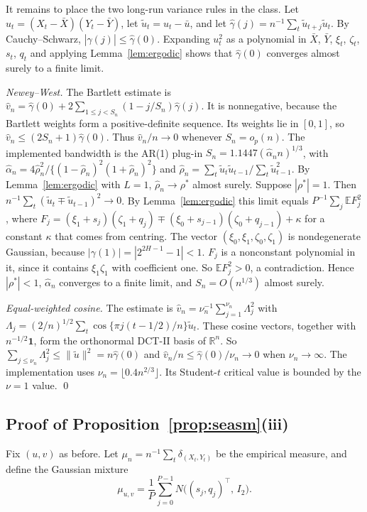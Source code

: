 \documentclass[11pt]{article}
\theoremstyle{remark}
\newcommand{\E}{\mathbb E}
\newcommand{\one}{\mathbf 1}
\begin{document}
It remains to place the two long-run variance rules in the class. Let $u_t=(X_t-\bar X)(Y_t-\bar Y)$, let $\tilde u_t=u_t-\bar u$, and let $\hat\gamma(j)=n^{-1}\sum_{t}\tilde u_{t+j}\tilde u_t$. By Cauchy--Schwarz, $|\hat\gamma(j)|\le\hat\gamma(0)$. Expanding $u_t^2$ as a polynomial in $\bar X$, $\bar Y$, $\xi_t$, $\zeta_t$, $s_t$, $q_t$ and applying Lemma~\ref{lem:ergodic} shows that $\hat\gamma(0)$ converges almost surely to a finite limit.

\emph{Newey--West.} The Bartlett estimate is $\hat v_n=\hat\gamma(0)+2\sum_{1\le j<S_n}(1-j/S_n)\hat\gamma(j)$. It is nonnegative, because the Bartlett weights form a positive-definite sequence. Its weights lie in $[0,1]$, so $\hat v_n\le(2S_n+1)\hat\gamma(0)$. Thus $\hat v_n/n\to0$ whenever $S_n=o_p(n)$. The implemented bandwidth is the \citet{andrews1991hac} AR(1) plug-in $S_n=1.1447(\hat\alpha_n n)^{1/3}$, with $\hat\alpha_n=4\hat\rho_n^2/\{(1-\hat\rho_n)^2(1+\hat\rho_n)^2\}$ and $\hat\rho_n=\sum_t\tilde u_t\tilde u_{t-1}/\sum_t\tilde u_{t-1}^2$. By Lemma~\ref{lem:ergodic} with $L=1$, $\hat\rho_n\to\rho^*$ almost surely. Suppose $|\rho^*|=1$. Then $n^{-1}\sum_t(\tilde u_t\mp\tilde u_{t-1})^2\to0$. By Lemma~\ref{lem:ergodic} this limit equals $P^{-1}\sum_j\E F_j^2$, where $F_j=(\xi_1+s_j)(\zeta_1+q_j)\mp(\xi_0+s_{j-1})(\zeta_0+q_{j-1})+\kappa$ for a constant $\kappa$ that comes from centring. The vector $(\xi_0,\xi_1,\zeta_0,\zeta_1)$ is nondegenerate Gaussian, because $|\gamma(1)|=|2^{2H-1}-1|<1$. $F_j$ is a nonconstant polynomial in it, since it contains $\xi_1\zeta_1$ with coefficient one. So $\E F_j^2>0$, a contradiction. Hence $|\rho^*|<1$, $\hat\alpha_n$ converges to a finite limit, and $S_n=O(n^{1/3})$ almost surely.

\emph{Equal-weighted cosine.} The estimate is $\hat v_n=\nu_n^{-1}\sum_{j=1}^{\nu_n}\Lambda_j^2$ with $\Lambda_j=(2/n)^{1/2}\sum_t\cos\{\pi j(t-1/2)/n\}\tilde u_t$. These cosine vectors, together with $n^{-1/2}\one$, form the orthonormal DCT-II basis of $\mathbb R^n$. So $\sum_{j\le\nu_n}\Lambda_j^2\le\|\tilde u\|^2=n\hat\gamma(0)$ and $\hat v_n/n\le\hat\gamma(0)/\nu_n\to0$ when $\nu_n\to\infty$. The implementation uses $\nu_n=\lfloor0.4n^{2/3}\rfloor$. Its Student-$t$ critical value is bounded by the $\nu=1$ value. \qed

\subsection{Proof of Proposition~\ref{prop:seasm}(iii)}
Fix $(u,v)$ as before. Let $\mu_n=n^{-1}\sum_t\delta_{(X_t,Y_t)}$ be the empirical measure, and define the Gaussian mixture
\[
\mu_{u,v}=\frac1P\sum_{j=0}^{P-1}N\big((s_j,q_j)^\top,\,I_2\big).
\]
\end{document}
